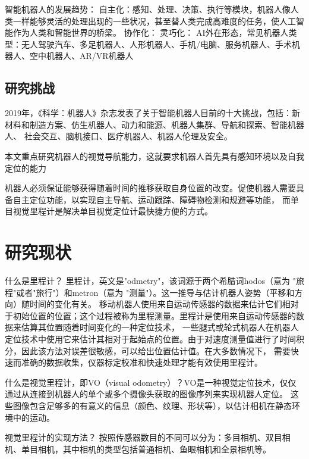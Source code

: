 智能机器人的发展趋势：
    自主化：感知、处理、决策、执行等模块，机器人像人类一样能够灵活的处理出现的一些状况，甚至替人类完成高难度的任务，使人工智能作为人类和智能世界的桥梁。
    协作化：
    灵巧化：
AI外在形态，常见机器人类型：无人驾驶汽车、多足机器人、人形机器人、手机/电脑、服务机器人、手术机器人、空中机器人、AR/VR机器人

\subsection{研究挑战}
2019年，《科学：机器人》杂志发表了关于智能机器人目前的十大挑战，包括：新材料和制造方案、仿生机器人、动力和能源、机器人集群、导航和探索、智能机器人、
        社会交互、脑机接口、医疗机器人、机器人伦理及安全。
        
本文重点研究机器人的视觉导航能力，这就要求机器人首先具有感知环境以及自我定位的能力

机器人必须保证能够获得随着时间的推移获取自身位置的改变。促使机器人需要具备自主定位功能，以实现自主导航、运动跟踪、障碍物检测和规避等功能，
而单目视觉里程计是解决单目视觉定位计最快捷方便的方式。

\section{研究现状}

什么是里程计？
里程计，英文是"odmetry"，该词源于两个希腊词hodos（意为 "旅程"或者"旅行"）和metron（意为 "测量"）\cite{2005Visual}。这一推导与估计机器人姿势（平移和方向）随时间的变化有关。
移动机器人使用来自运动传感器的数据来估计它们相对于初始位置的位置；这个过程被称为里程测量。里程计是使用来自运动传感器的数据来估算其位置随着时间变化的一种定位技术，
一些腿式或轮式机器人在机器人定位技术中使用它来估计其相对于起始点的位置。由于对速度测量值进行了时间积分，因此该方法对误差很敏感，可以给出位置估计值。在大多数情况下，
需要快速而准确的数据收集，仪器标定校准和快速处理才能有效使用里程计。

什么是视觉里程计，即VO（visual odometry）？VO是一种视觉定位技术，仅仅通过从连接到机器人的单个或多个摄像头获取的图像序列来实现机器人定位\cite{2008Monocular}。
这些图像包含足够多的有意义的信息（颜色、纹理、形状等），以估计相机在静态环境中的运动\cite{Rone2013Mapping}。

视觉里程计的实现方法？
按照传感器数目的不同可以分为：多目相机、双目相机、单目相机，其中相机的类型包括普通相机、鱼眼相机和全景相机等。

